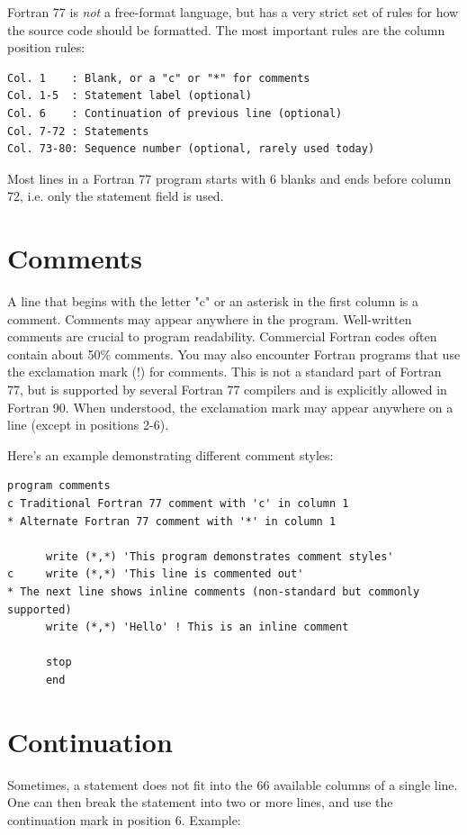 Fortran 77 is \emph{not} a free-format language, but has a very strict set of rules for how the source code should be formatted. The most important rules are the column position rules:

\begin{lstlisting}[style=fortran77]
Col. 1    : Blank, or a "c" or "*" for comments
Col. 1-5  : Statement label (optional)
Col. 6    : Continuation of previous line (optional)
Col. 7-72 : Statements
Col. 73-80: Sequence number (optional, rarely used today)
\end{lstlisting}

Most lines in a Fortran 77 program starts with 6 blanks and ends before column 72, i.e. only the statement field is used.

\section{Comments}

A line that begins with the letter "c" or an asterisk in the first column is a comment. Comments may appear anywhere in the program. Well-written comments are crucial to program readability. Commercial Fortran codes often contain about 50\% comments. You may also encounter Fortran programs that use the exclamation mark (!) for comments. This is not a standard part of Fortran 77, but is supported by several Fortran 77 compilers and is explicitly allowed in Fortran 90. When understood, the exclamation mark may appear anywhere on a line (except in positions 2-6).

Here's an example demonstrating different comment styles:

\begin{lstlisting}[style=fortran77]
      program comments
c Traditional Fortran 77 comment with 'c' in column 1
* Alternate Fortran 77 comment with '*' in column 1
      
      write (*,*) 'This program demonstrates comment styles'
c     write (*,*) 'This line is commented out'
* The next line shows inline comments (non-standard but commonly supported)
      write (*,*) 'Hello' ! This is an inline comment
      
      stop
      end
\end{lstlisting}

\section{Continuation}

Sometimes, a statement does not fit into the 66 available columns of a single line. One can then break the statement into two or more lines, and use the continuation mark in position 6. Example:


